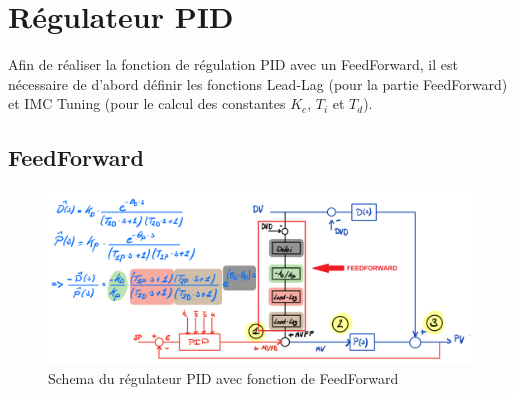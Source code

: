 \section{Régulateur PID}

Afin de réaliser la fonction de régulation PID avec un FeedForward, il est nécessaire de d'abord
définir les fonctions Lead-Lag (pour la partie FeedForward) et IMC Tuning (pour le calcul des constantes $K_c$, $T_i$ et $T_d$).

\subsection{FeedForward}

\begin{figure}[h]
    \centering
    \includegraphics[width=\textwidth]{figures/schemaFF.png}
    \caption{Schema du régulateur PID avec fonction de FeedForward}
	\label{fig:schemaFF}
\end{figure}

